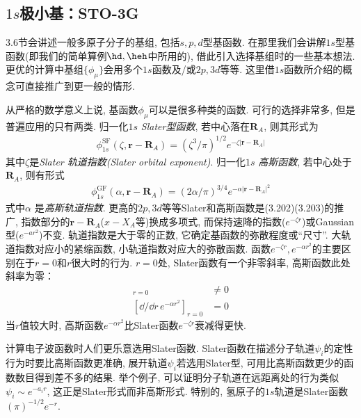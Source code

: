\subsection{$1s$极小基：STO-3G}
\label{sec3.5.1}
3.6节会讲述一般多原子分子的基组, 包括$s,p,d$型基函数. 
在那里我们会讲解$1s$型基函数(即我们的简单算例$\hd,\heh$中所用的), 借此引入选择基组时的一些基本想法. 
更优的计算中基组$\{\phi_\mu\}$会用多个$1s$函数及/或$2p,3d$等等. 
这里借$1s$函数所介绍的概念可直接推广到更一般的情形.

从严格的数学意义上说, 
基函数$\phi_\mu$可以是很多种类的函数. 
可行的选择非常多, 
但是普遍应用的只有两类. 
归一化$1s$ \emph{Slater型函数}, 
若中心落在$\mathbf{R}_A$, 
则其形式为
\begin{align}
	\phi_{1s}^\mathrm{SF}(\zeta,\mathbf{r-R}_A) = (\zeta^3/\pi)^{1/2}e^{-\zeta|\mathbf{r-R}_A|}
\end{align}
其中$\zeta$是\emph{Slater 轨道指数(Slater orbital exponent)}. 
归一化$1s$ \emph{高斯函数}, 
若中心处于$\mathbf{R}_A$, 
则有形式
\begin{align}
	\phi_{1s}^\mathrm{GF}(\alpha,\mathbf{r-R}_A) = (2\alpha/\pi)^{3/4}e^{-\alpha|\mathbf{r-R}_A|^2}
\end{align}
式中$\alpha$ 是\emph{高斯轨道指数}. 
更高的$2p,3d$等等Slater和高斯函数是(3.202)(3.203)的推广, 
指数部分的$\mathbf{r-R}_A$($x-X_A$等)换成多项式, 
而保持速降的指数($e^{-\zeta r}$)或Gaussian型($e^{-ar^2}$)不变. 
轨道指数是大于零的正数, 
它确定基函数的弥散程度或``尺寸''. 
大轨道指数对应小的紧缩函数, 
小轨道指数对应大的弥散函数. 
函数$e^{-\zeta r},e^{-\alpha r^2}$的主要区别在于$r=0$和$r$很大时的行为. 
$r=0$处, 
Slater函数有一个非零斜率, 
高斯函数此处斜率为零：
\begin{align}
	[\dd/\dd r\, e^{-\zeta r}]_{r=0}& \neq 0\\
	[\dd/\dd r\, e^{-\alpha r^2}]_{r=0}&  =   0
\end{align}
当$r$值较大时, 
高斯函数$e^{-\alpha r^2}$比Slater函数$e^{-\zeta r}$衰减得更快.


计算电子波函数时人们更乐意选用Slater函数. 
Slater函数在描述分子轨道$\psi_i$的定性行为时要比高斯函数更准确, 
展开轨道$\psi_i$若选用Slater型, 
可用比高斯函数更少的函数数目得到差不多的结果. 
举个例子, 
可以证明分子轨道在远距离处的行为类似$\psi_i\sim e^{-a_ir}$, 
这正是Slater形式而非高斯形式. 
特别的, 
氢原子的$1s$轨道是Slater函数$(\pi)^{-1/2}e^{-r}$.


